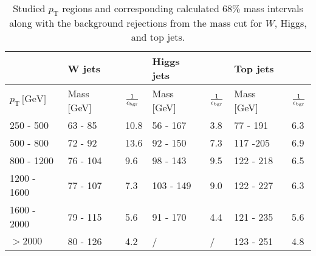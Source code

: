 \begin{table}[b]
\centering
\begin{tabular}{l||ll||ll||ll}
  &  \textbf{W jets}                                                    &                                 &  \textbf{Higgs jets}                                  &                                &    \textbf{Top jets}                                  &                                  \\ \hline
$p_{\mathrm{T}} \, \text{[GeV]}$   & \multicolumn{1}{l|}{Mass [GeV]} & $\frac{1}{\epsilon_{\rm bgr}}$ & \multicolumn{1}{l|}{Mass [GeV]} & $\frac{1}{\epsilon_{\rm bgr}}$ & \multicolumn{1}{l|}{Mass [GeV]}  & $\frac{1}{\epsilon_{\rm bgr}}$ \\ \hline \hline
250 - 500 & \multicolumn{1}{l|}{63 - 85}                        & 10.8                            & \multicolumn{1}{l|}{56 - 167}          & 3.8                             & \multicolumn{1}{l|}{77 - 191}          & 6.3                             \\ \cline{1-7} 
500 - 800 & \multicolumn{1}{l|}{72 - 92}                        & 13.6                            & \multicolumn{1}{l|}{92 - 150}          & 7.3                             & \multicolumn{1}{l|}{117 -205}          & 6.9                             \\ \cline{1-7} 
800 - 1200 & \multicolumn{1}{l|}{76 - 104}                       & 9.6                             & \multicolumn{1}{l|}{98 - 143}          & 9.5                             & \multicolumn{1}{l|}{122 - 218}         & 6.5                             \\ \cline{1-7} 
1200 - 1600 & \multicolumn{1}{l|}{77 - 107}                       & 7.3                             & \multicolumn{1}{l|}{103 - 149}         & 9.0                             & \multicolumn{1}{l|}{122 - 227}         & 6.3                             \\ \cline{1-7} 
1600 - 2000 & \multicolumn{1}{l|}{79 - 115}                       & 5.6                             & \multicolumn{1}{l|}{91 - 170}          & 4.4                             & \multicolumn{1}{l|}{121 - 235}         & 5.6                             \\ \cline{1-7} 
$> 2000$ & \multicolumn{1}{l|}{80 - 126}                       & 4.2                             & \multicolumn{1}{l|}{/}                 & /                               & \multicolumn{1}{l|}{123 - 251}         & 4.8                             \\ \hline
\end{tabular}
\caption{{Studied $p_{\mathrm{T}}$ regions and corresponding calculated 68\% mass intervals along with the background rejections from the mass cut for $W$, Higgs, and top jets.}} 
\label{table:mass_cut}
\end{table} 


